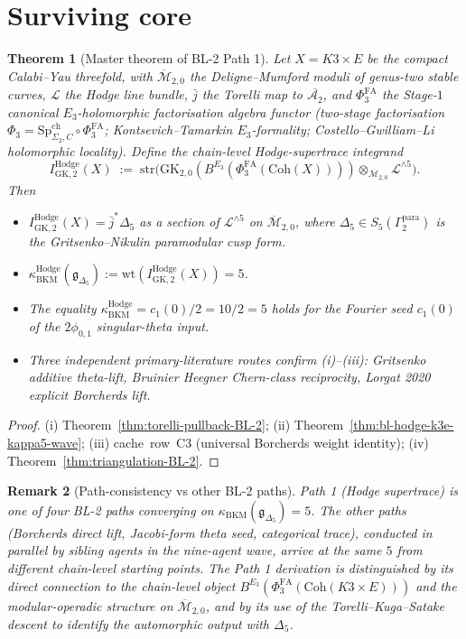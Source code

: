 \documentclass[11pt]{article}
\newtheorem{theorem}{Theorem}[section]
\newtheorem{remark}[theorem]{Remark}
\providecommand{\Ethree}{E_3}
\providecommand{\Coh}{\mathrm{Coh}}
\providecommand{\cA}{\mathcal{A}}
\providecommand{\cL}{\mathcal{L}}
\providecommand{\fg}{\mathfrak{g}}
\providecommand{\kBKM}{\kappa_{\mathrm{BKM}}}
\providecommand{\kHodge}{\kappa_{\mathrm{BKM}}^{\mathrm{Hodge}}}
\providecommand{\Mbar}{\overline{\mathcal M}}
\providecommand{\SpCh}{\mathrm{Sp}^{\mathrm{ch}}}
\providecommand{\PhiFA}{\Phi^{\mathrm{FA}}}
\providecommand{\str}{\mathrm{str}}
\begin{document}
\section{Surviving core}
\label{sec:surviving-core}

\begin{theorem}[Master theorem of BL-2 Path 1]
\label{thm:bl-hodge-k3e-kappa5-master-BL-2}
Let $X = K3 \times E$ be the compact Calabi--Yau threefold, with
$\Mbar_{2, 0}$ the Deligne--Mumford moduli of genus-two stable curves,
$\cL$ the Hodge line bundle, $\bar j$ the Torelli map to
$\overline{\cA_2}$, and $\PhiFA_3$ the Stage-$1$ canonical
$\Ethree$-holomorphic factorisation algebra functor (two-stage
factorisation $\Phi_3 = \SpCh_{\Sigma_2, C} \circ \PhiFA_3$;
Kontsevich--Tamarkin $\Ethree$-formality; Costello--Gwilliam--Li
holomorphic locality). Define the chain-level Hodge-supertrace
integrand
\[
  I^{\mathrm{Hodge}}_{\mathrm{GK}, 2}(X)
  \;:=\; \str\!\bigl(
    \mathrm{GK}_{2, 0}(B^{\Ethree}(\PhiFA_3(\Coh(X))))
    \otimes_{\Mbar_{2, 0}} \cL^{\wedge 5}
  \bigr).
\]
Then
\begin{itemize}
\item[\textup{(i)}] $I^{\mathrm{Hodge}}_{\mathrm{GK}, 2}(X) = \bar j^* \Delta_5$
as a section of $\cL^{\wedge 5}$ on $\Mbar_{2, 0}$, where
$\Delta_5 \in S_5(\Gamma_2^{\mathrm{para}})$ is the Gritsenko--Nikulin
paramodular cusp form.
\item[\textup{(ii)}] $\kHodge(\fg_{\Delta_5}) := \mathrm{wt}(I^{\mathrm{Hodge}}_{\mathrm{GK}, 2}(X)) = 5$.
\item[\textup{(iii)}] The equality $\kHodge = c_1(0)/2 = 10/2 = 5$ holds
for the Fourier seed $c_1(0)$ of the $2\phi_{0, 1}$ singular-theta input.
\item[\textup{(iv)}] Three independent primary-literature routes confirm
(i)--(iii): Gritsenko additive theta-lift, Bruinier Heegner Chern-class
reciprocity, Lorgat 2020 explicit Borcherds lift.
\end{itemize}
\end{theorem}

\begin{proof}
(i) Theorem~\ref{thm:torelli-pullback-BL-2};
(ii) Theorem~\ref{thm:bl-hodge-k3e-kappa5-wave};
(iii) cache~row~C3 (universal Borcherds weight identity);
(iv) Theorem~\ref{thm:triangulation-BL-2}.
\end{proof}

\begin{remark}[Path-consistency vs other BL-2 paths]
Path 1 (Hodge supertrace) is one of four BL-2 paths converging on
$\kBKM(\fg_{\Delta_5}) = 5$. The other paths (Borcherds direct lift,
Jacobi-form theta seed, categorical trace), conducted in parallel by
sibling agents in the nine-agent wave, arrive at the same $5$ from
different chain-level starting points. The Path 1 derivation is
distinguished by its direct connection to the chain-level object
$B^{\Ethree}(\PhiFA_3(\Coh(K3 \times E)))$ and the modular-operadic
structure on $\Mbar_{2, 0}$, and by its use of the Torelli--Kuga--Satake
descent to identify the automorphic output with $\Delta_5$.
\end{remark}
\end{document}
